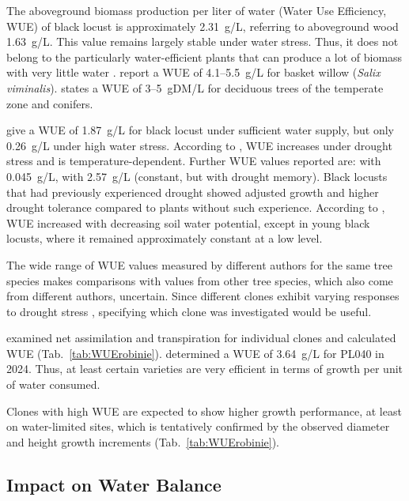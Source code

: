 The aboveground biomass production per liter of water (Water Use Efficiency, WUE) of black locust is approximately 2.31~g/L, referring to aboveground wood 1.63~g/L. This value remains largely stable under water stress. Thus, it does not belong to the particularly water-efficient plants that can produce a lot of biomass with very little water \citep{mantovani2014robinieWasser}. \citet{lindroth1994wasserverbrauchWeide} report a WUE of 4.1--5.5~g/L for basket willow (\emph{Salix viminalis}). \citet{lacher2001OekophysiologieDerPflanzen} states a WUE of 3--5~gDM/L for deciduous trees of the temperate zone and conifers.

\citet{ombodi2022robinieWasserverbrauch} give a WUE of 1.87~g/L for black locust under sufficient water supply, but only 0.26~g/L under high water stress. According to \citet{veste2013robinie}, WUE increases under drought stress and is temperature-dependent. Further WUE values reported are: \citet{raper1992robinieWasserverbrauch} with 0.045~g/L, \citet{mantovani2014robinieWue} with 2.57~g/L (constant, but with drought memory). Black locusts that had previously experienced drought showed adjusted growth and higher drought tolerance compared to plants without such experience. According to \citet{wang2007robinie}, WUE increased with decreasing soil water potential, except in young black locusts, where it remained approximately constant at a low level.

The wide range of WUE values measured by different authors for the same tree species makes comparisons with values from other tree species, which also come from different authors, uncertain. Since different clones exhibit varying responses to drought stress \citep{mapelli2019robinieTrockenstress}, specifying which clone was investigated would be useful.

\citet{abri2022robinieTrokenresistenz,abri2023robiieWasser,abri2023robinieDroughtTolerance} examined net assimilation and transpiration for individual clones and calculated WUE (Tab.~\ref{tab:WUErobinie}). \citet{abri2025robinieTrockenheit} determined a WUE of 3.64~g/L for PL040 in 2024. Thus, at least certain varieties are very efficient in terms of growth per unit of water consumed.

Clones with high WUE are expected to show higher growth performance, at least on water-limited sites, which is tentatively confirmed by the observed diameter and height growth increments (Tab.~\ref{tab:WUErobinie}).


\subsection{Impact on Water Balance}

